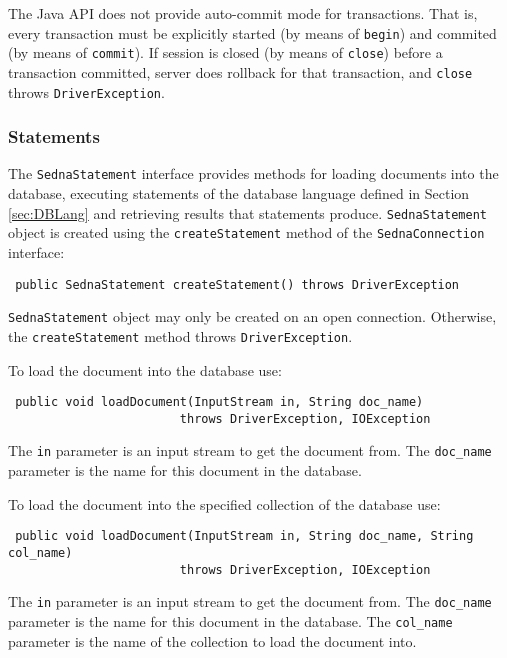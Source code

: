 \documentclass[a4paper,12pt]{article}
\begin{document}
The Java API does not provide auto-commit mode for transactions. That is, every transaction must be explicitly started (by means of \verb!begin!) and commited (by means of \verb!commit!). If session is closed (by means of \verb!close!) before a transaction committed, server does rollback for that transaction, and \verb!close! throws \verb!DriverException!.



\subsubsection{Statements}
The \verb!SednaStatement! interface provides methods for loading documents into the database, executing statements of the database language defined in Section \ref{sec:DBLang} and retrieving results that statements produce.
\verb!SednaStatement! object is created using the \verb!createStatement! method of the \verb!SednaConnection! interface:

\begin{verbatim}
 public SednaStatement createStatement() throws DriverException
\end{verbatim}

\verb!SednaStatement! object may only be created on an open connection. Otherwise, the  \verb!createStatement! method throws \verb!DriverException!.

To load the document into the database use:

\begin{verbatim}
 public void loadDocument(InputStream in, String doc_name)
                        throws DriverException, IOException
\end{verbatim}

The \verb!in! parameter is an input stream to get the document from. The \verb!doc_name! parameter is the name for this document in the database.

To load the document into the specified collection of the database use:

\begin{verbatim}
 public void loadDocument(InputStream in, String doc_name, String col_name)
                        throws DriverException, IOException
\end{verbatim}

The \verb!in! parameter is an input stream to get the document from. The \verb!doc_name! parameter is the name for this document in the database. The \verb!col_name! parameter is the name of the collection to load the document into.
\end{document}
